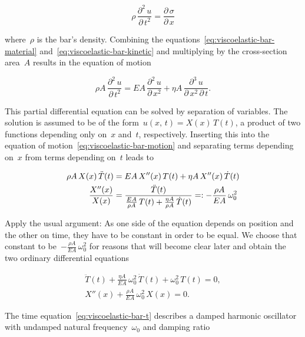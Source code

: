 \begin{equation}
\rho\,\frac{\partial^2\,u}{\partial\,t^2} = \frac{\partial\,\sigma}{\partial\,x}\label{eq:viscoelastic-bar-kinetic}
\end{equation}

where~$\rho$ is the bar's density. Combining the equations~\eqref{eq:viscoelastic-bar-material} and~\eqref{eq:viscoelastic-bar-kinetic} and multiplying by the cross-section area~$A$ results in the equation of motion

\begin{equation}
\rho A\,\frac{\partial^2\,u}{\partial\,t^2} = EA\,\frac{\partial^2\,u}{\partial\,x^2} + \eta A\,\frac{\partial^3\,u}{\partial\,x^2\,\partial\,t}.\label{eq:viscoelastic-bar-motion}
\end{equation}

This partial differential equation can be solved by separation of variables.
The solution is assumed to be of the form~$u(x,\,t) = X(x)\,T(t)$, a product of two functions depending only on~$x$ and~$t$, respectively.
Inserting this into the equation of motion~\eqref{eq:viscoelastic-bar-motion} and separating terms depending on~$x$ from terms depending on~$t$ leads to

\begin{align}
\rho A\,X(x)\,\ddot{T}(t) &= EA\,X''(x)\,T(t) + \eta A\,X''(x)\,\dot{T}(t)\notag \\
\frac{X''(x)}{X(x)} &= \frac{\ddot{T}(t)}{\frac{EA}{\rho A}\,T(t) + \frac{\eta A}{\rho A}\,\dot{T}(t)} =: -\frac{\rho A}{EA}\,\omega_0^2\label{eq:viscoelastic-bar-separated}
\end{align}

Apply the usual argument: As one side of the equation depends on position and the other on time, they have to be constant in order to be equal. We choose that constant to be~$-\frac{\rho A}{EA}\,\omega_0^2$ for reasons that will become clear later and obtain the two ordinary differential equations

\begin{align}
\ddot{T}(t) + \frac{\eta A}{EA}\,\omega_0^2\,\dot{T}(t) + \omega_0^2\,T(t) = 0,\label{eq:viscoelastic-bar-t} \\
X''(x) + \frac{\rho A}{EA}\,\omega_0^2\,X(x) = 0.\label{eq:viscoelastic-bar-x}
\end{align}

The time equation~\eqref{eq:viscoelastic-bar-t} describes a damped harmonic oscillator with undamped natural frequency~$\omega_0$ and damping ratio

